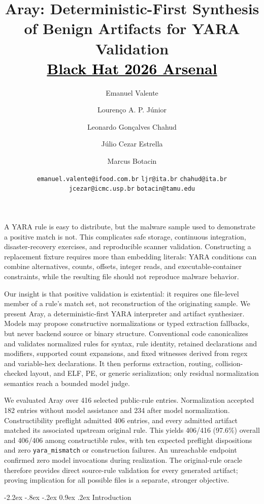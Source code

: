 \documentclass[11pt,twocolumn]{article}
\title{%
  \textbf{Aray: Deterministic-First Synthesis of Benign Artifacts for YARA Validation}\\[0.55em]
  \large\href{https://blackhat.com/us-26/arsenal/schedule/\#aray-benign-binary-synthesis-for-signature-validation-without-the-malware-52919}{%
    \textcolor{black}{\textbf{Black Hat 2026 Arsenal}}%
  }
}
\author[1,2]{Emanuel Valente}
\author[3]{Lourenço A. P. Júnior}
\author[3]{Leonardo Gonçalves Chahud}
\author[2]{Júlio Cezar Estrella}
\author[4]{Marcus Botacin}
\affil[1]{iFood}
\affil[2]{University of São Paulo (USP)}
\affil[3]{Aeronautics Institute of Technology (ITA)}
\affil[4]{Texas A\&M University (TAMU)}
\date{%
  \vspace{-0.8em}\footnotesize
  \texttt{emanuel.valente@ifood.com.br}\quad
  \texttt{ljr@ita.br}\quad
  \texttt{chahud@ita.br}\\[-0.1em]
  \texttt{jcezar@icmc.usp.br}\quad
  \texttt{botacin@tamu.edu}
}
\makeatletter
\newcommand{\tool}{\textsc{Aray}\xspace}
\newcommand{\code}[1]{\texttt{#1}}
\renewcommand\section{\@startsection{section}{1}{\z@}%
  {-2.2ex \@plus -.8ex \@minus -.2ex}%
  {0.9ex \@plus .2ex}%
  {\normalfont\large\bfseries}}
\renewenvironment{abstract}{%
  \par\small\bfseries
  \renewcommand{\tool}{\textup{Aray}\xspace}%
  \noindent\textit{\abstractname}\textemdash\ignorespaces
}{%
  \par\normalfont\normalsize\vspace{0.6em}
}
\makeatother
\begin{document}
\maketitle
\vspace{-1.2em}

\begin{abstract}
A YARA rule is easy to distribute, but the malware sample used to demonstrate a
positive match is not. This complicates safe storage, continuous integration,
disaster-recovery exercises, and reproducible scanner validation. Constructing a
replacement fixture requires more than embedding literals: YARA conditions can
combine alternatives, counts, offsets, integer reads, and executable-container
constraints, while the resulting file should not reproduce malware behavior.

Our insight is that positive validation is existential: it requires one
file-level member of a rule's match set, not reconstruction of the originating
sample. We present \tool, a deterministic-first YARA interpreter and artifact
synthesizer. Models may propose constructive normalizations or typed extraction
fallbacks, but never backend source or binary structure. Conventional code
canonicalizes and validates normalized rules for syntax, rule identity, retained
declarations and modifiers, supported count expansions, and fixed witnesses
derived from regex and variable-hex declarations. It then performs extraction,
routing, collision-checked layout, and ELF, PE, or generic serialization; only
residual normalization semantics reach a bounded model judge.

We evaluated \tool over 416 selected public-rule entries. Normalization accepted
182 entries without model assistance and 234 after model normalization.
Constructibility preflight admitted 406 entries, and every admitted artifact
matched its associated upstream original rule. This yields 406/416 (97.6\%)
overall and 406/406 among constructible rules, with ten expected preflight
dispositions and zero \code{yara\_mismatch} or construction failures. An
unreachable endpoint confirmed zero model invocations during realization. The
original-rule oracle therefore provides direct source-rule validation for every
generated artifact; proving implication for all possible files is a separate,
stronger objective.
\end{abstract}

\section{Introduction}
\end{document}

